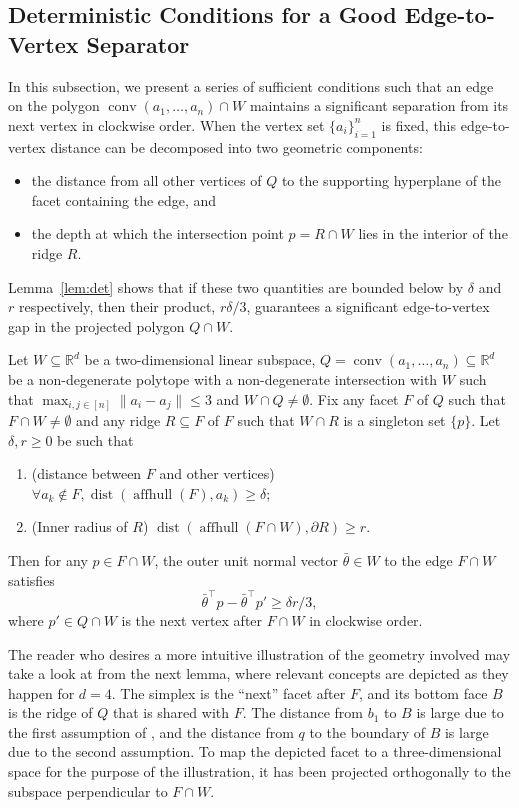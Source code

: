 \documentclass{theoretics}
\newcommand{\R}{\mathbb R}
\newcommand{\T}{\top}
\newcommand{\aff}{\operatorname{affhull}}
\newcommand{\conv}{\operatorname{conv}}
\newcommand{\dist}{\operatorname{dist}}
\renewcommand{\subset}{\subseteq}
\begin{document}
\subsection{Deterministic Conditions for a Good Edge-to-Vertex Separator} \label{sub:det}


In this subsection, we present a series of sufficient conditions such that an edge on the polygon $\conv(a_1, \ldots, a_n) \cap W$ maintains a significant separation from its next vertex in clockwise order. When the vertex set $\{a_i\}_{i=1}^n$ is fixed, this edge-to-vertex distance can be decomposed into two geometric components:
\begin{itemize}
    \item the distance from all other vertices of $Q$ to the supporting hyperplane of the facet containing the edge, and
    \item the depth at which the intersection point $p = R \cap W$ lies in the interior of the ridge $R$.
\end{itemize}
Lemma~\ref{lem:det} shows that if these two quantities are bounded below by $\delta$ and $r$ respectively, then their product, $r\delta/3$, guarantees a significant edge-to-vertex gap in the projected polygon $Q \cap W$.



\begin{lemma}\label{lem:det}
Let $W \subset \R^d$ be a two-dimensional linear subspace,
$Q = \conv(a_1, \ldots, a_n) \subset \R^d$ be a non-degenerate polytope
with a non-degenerate intersection with $W$
such that $\max_{i, j\in [n]} \|a_i - a_j\| \leq 3$ and $W \cap Q \neq \emptyset$.
Fix any facet $F$ of $Q$ such that $F \cap W \neq \emptyset$
and any ridge $R \subset F$ of $F$ such that $W \cap R$ is a singleton set $\{p\}$.
Let $\delta, r \geq 0$ be such that
\begin{enumerate}
    \item (distance between $F$ and other vertices) $\forall a_k \notin F, \dist(\aff(F), a_k) \geq \delta$;
    \item (Inner radius of $R$) $\dist(\aff(F \cap W), \partial R) \geq r$.
\end{enumerate}
Then for any $p \in F \cap W$, the outer unit normal vector $\bar{\theta} \in W$
to the edge $F \cap W$ satisfies
\[
\bar{\theta}^\T p - \bar{\theta}^\top p' \geq \delta r/3,
\]
where $p' \in Q \cap W$ is the next vertex after $F \cap W$ in clockwise order.
\end{lemma}

The reader who desires a more intuitive illustration of the geometry involved
may take a look at  from the next lemma, where relevant concepts are depicted
as they happen for $d=4$. The simplex is the ``next'' facet after $F$, and its bottom face $B$
is the ridge of $Q$ that is shared with $F$.
The distance from $b_1$ to $B$ is large due to the first assumption of ,
and the distance from $q$ to the boundary of $B$ is large due to the second assumption.
To map the depicted facet to a three-dimensional space for the purpose of the illustration,
it has been projected orthogonally to the subspace perpendicular to $F \cap W$.
\end{document}

